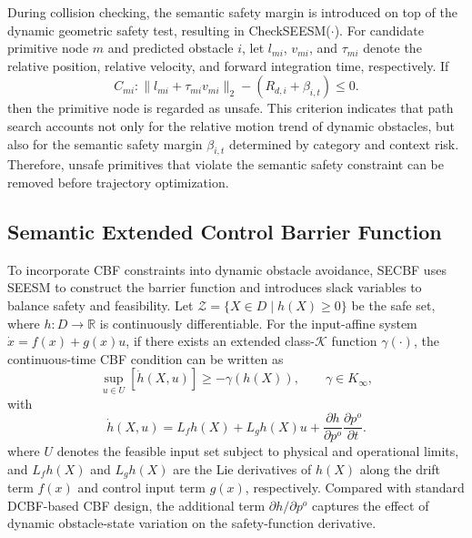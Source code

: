 \documentclass[journal]{IEEEtranTIE}
\begin{document}
    During collision checking, the semantic safety margin is introduced on top
    of the dynamic geometric safety test, resulting in CheckSEESM($\cdot$). For
    candidate primitive node $m$ and predicted obstacle $i$, let $l_{mi}$,
    $v_{mi}$, and $\tau_{mi}$ denote the relative position, relative velocity,
    and forward integration time, respectively. If
    \begin{equation}
    C_{mi}:
    \|l_{mi}+\tau_{mi}v_{mi}\|_2-(R_{d,i}+\beta_{i,t})\le0.
    \end{equation}
    then the primitive node is regarded as unsafe. This criterion indicates that
    path search accounts not only for the relative motion trend of dynamic
    obstacles, but also for the semantic safety margin $\beta_{i,t}$ determined
    by category and context risk. Therefore, unsafe primitives that violate the
    semantic safety constraint can be removed before trajectory optimization.

    \subsection{Semantic Extended Control Barrier Function}
    To incorporate CBF constraints into dynamic obstacle avoidance, SECBF uses
    SEESM to construct the barrier function and introduces slack variables to
    balance safety and feasibility. Let
    $\mathcal{Z}=\{X\in D\mid h(X)\ge0\}$ be the safe set, where
    $h:D\to\mathbb{R}$ is continuously differentiable. For the input-affine
    system $\dot{x}=f(x)+g(x)u$, if there exists an extended class-$\mathcal{K}$
    function $\gamma(\cdot)$, the continuous-time CBF condition can be written as
    \begin{equation}
    \sup_{u\in U}\left[\dot{h}(X,u)\right]\ge -\gamma(h(X)),
    \qquad \gamma\in K_\infty,
    \end{equation}
    with
    \begin{equation}
    \dot{h}(X,u)
    =
    L_fh(X)+L_gh(X)u+
    \frac{\partial h}{\partial p^o}\frac{\partial p^o}{\partial t}.
    \end{equation}
    where $U$ denotes the feasible input set subject to physical and operational
    limits, and $L_fh(X)$ and $L_gh(X)$ are the Lie derivatives of $h(X)$ along
    the drift term $f(x)$ and control input term $g(x)$, respectively. Compared
    with standard DCBF-based CBF design, the additional term
    $\partial h/\partial p^o$ captures the effect of dynamic obstacle-state
    variation on the safety-function derivative.
\end{document}
